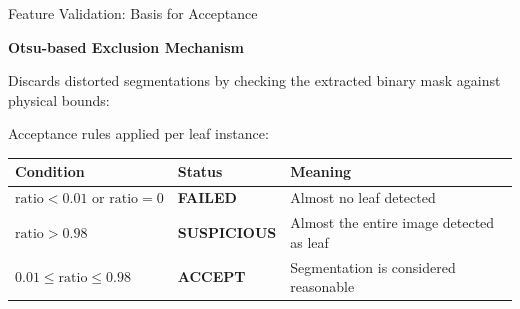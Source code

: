 \documentclass[aspectratio=169, 11pt]{beamer}
\begin{document}
\begin{frame}{Feature Validation: Basis for Acceptance}


    \textbf{Otsu-based Exclusion Mechanism \cite{otsu1979threshold}}
    \vspace{0.15cm}

    {\footnotesize Discards distorted segmentations by checking the extracted binary mask against physical bounds:}

    \vspace{0.2cm}
    \begin{center}
    \end{center}

    \vspace{0.2cm}
    {\footnotesize Acceptance rules applied per leaf instance:}

    \vspace{0.1cm}
    \small
    \begin{center}
    \begin{tabular}{@{}lll@{}}
        \toprule
        \textbf{Condition} & \textbf{Status} & \textbf{Meaning} \\
        \midrule
        $\text{ratio} < 0.01 \text{ or } \text{ratio} = 0$ & \textcolor{amritaMaroon}{\bfseries FAILED} & Almost no leaf detected \\
        $\text{ratio} > 0.98$ & \textcolor{goldAccent}{\bfseries SUSPICIOUS} & Almost the entire image detected as leaf \\
        $0.01 \le \text{ratio} \le 0.98$ & \textbf{ACCEPT} & Segmentation is considered reasonable \\
        \bottomrule
    \end{tabular}
    \end{center}
\end{frame}
\end{document}
